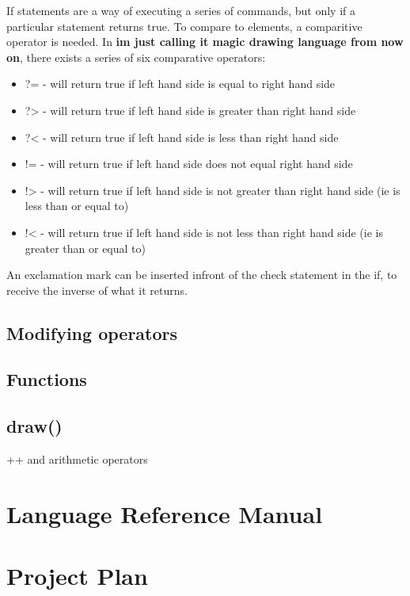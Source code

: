 \documentclass{l3proj}
\begin{document}
If statements are a way of executing a series of commands, but only if a particular statement returns true. To compare to elements, a comparitive operator is needed. In \textbf{im just calling it magic drawing language from now on}, there exists a series of six comparative operators:
\begin{itemize}
\item ?= - will return true if left hand side is equal to right hand side
\item ?> - will return true if left hand side is greater than right hand side
\item ?< - will return true if left hand side is less than right hand side
\item != - will return true if left hand side does not equal right hand side
\item !> - will return true if left hand side is not greater than right hand side (ie is less than or equal to)
\item !< - will return true if left hand side is not less than right hand side (ie is greater than or equal to)
\end{itemize}
An exclamation mark can be inserted infront of the check statement in the if, to receive the inverse of what it returns.

\section{Modifying operators}

\section{Functions}

\section{draw()}
++ and arithmetic operators



\chapter{Language Reference Manual}
\label{manual}

\chapter{Project Plan}
\label{plan}
\end{document}
